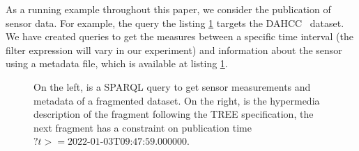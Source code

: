 As a running example throughout this paper, we consider the publication of sensor data.
For example, the query the listing \ref{lst:system} targets the DAHCC~\cite{dahcc_resource} dataset.
We have created queries to get the measures between a specific time interval (the filter expression will vary in our experiment) 
and information about the sensor using a metadata file, which is available at listing \ref{lst:system}.

\begin{figure}[h]
    \begin{minipage}{0.50\textwidth}
        \centering
        
    \end{minipage}
    \hspace{0.05\textwidth}
    \begin{minipage}{0.40\textwidth}
        \centering
        
    \end{minipage}
    \caption{On the left, is a SPARQL query to get sensor measurements and metadata of a fragmented dataset.
    On the right, is the hypermedia description of the fragment following the TREE specification, the next fragment
    has a constraint on publication time $?t>= \text{2022-01-03T09:47:59.000000}$.}
        \label{lst:system}
\end{figure}